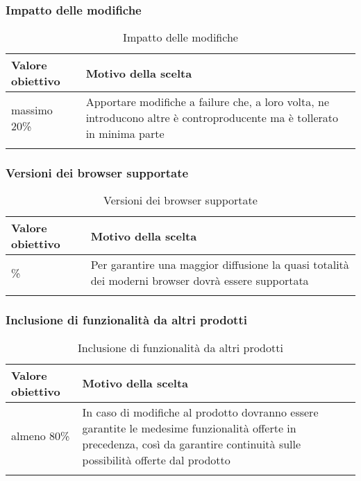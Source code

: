 \documentclass[../PianoDiQualifica_v3.0.0.tex]{subfiles}
\begin{document}
		\subsubsection{Impatto delle modifiche}
			\begin{longtable}[c] { >{\centering\arraybackslash}p{4cm} p{7cm} }
				\toprule
				\centerline{\textbf{Valore obiettivo}} & \centerline{\textbf{Motivo della scelta}} \\
				\midrule
					massimo 20\% & Apportare modifiche a failure che, a loro volta, ne introducono altre è controproducente ma è tollerato in minima parte \\
				\bottomrule
				\caption{Impatto delle modifiche}
			\end{longtable}

		\subsubsection{Versioni dei browser supportate}
			\begin{longtable}[c] { >{\centering\arraybackslash}p{4cm} p{7cm} }
				\toprule
				\centerline{\textbf{Valore obiettivo}} & \centerline{\textbf{Motivo della scelta}} \\
				\midrule
					95\% &	Per garantire una maggior diffusione la quasi totalità dei moderni browser dovrà essere supportata \\
				\bottomrule
				\caption{Versioni dei browser supportate}
			\end{longtable}

		\subsubsection{Inclusione di funzionalità da altri prodotti}
			\begin{longtable}[c] { >{\centering\arraybackslash}p{4cm} p{7cm} }
				\toprule
				\centerline{\textbf{Valore obiettivo}} & \centerline{\textbf{Motivo della scelta}} \\
				\midrule
					almeno 80\% & In caso di modifiche al prodotto dovranno essere garantite le medesime funzionalità  offerte in precedenza, così da garantire continuità sulle possibilità offerte dal prodotto \\
				\bottomrule
				\caption{Inclusione di funzionalità da altri prodotti}
			\end{longtable}
\end{document}
